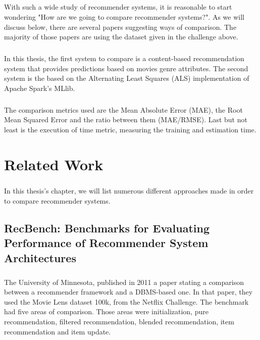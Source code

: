 \paragraph{} With such a wide study of recommender systems, it is reasonable to start wondering "How are we going to compare recommender systems?". As we will discuss below, there are several papers suggesting ways of comparison. The majority of those papers are using the dataset given in the challenge above.

\paragraph{} In this thesis, the first system to compare is a content-based recommendation system that provides predictions based on movies genre attributes. The second system is the based on the Alternating Least Squares (ALS) implementation of Apache Spark's MLlib.

\paragraph{} The comparison metrics used are the Mean Absolute Error (MAE), the Root Mean Squared Error and the ratio between them (MAE/RMSE). Last but not least is the execution of time metric, measuring the training and estimation time.

\chapter{Related Work}
\paragraph{} In this thesis's chapter, we will list numerous different approaches made in order to compare recommender systems.

\section{RecBench: Benchmarks for Evaluating Performance of Recommender System Architectures \cite{levandoski2011recbench}}
\paragraph{} The University of Minnesota, published in 2011 a paper stating a comparison between a recommender framework and a DBMS-based one. In that paper, they used the Movie Lens dataset 100k, from the Netflix Challenge. The benchmark had five areas of comparison. Those areas were initialization, pure recommendation, filtered recommendation, blended recommendation, item recommendation and item update.

